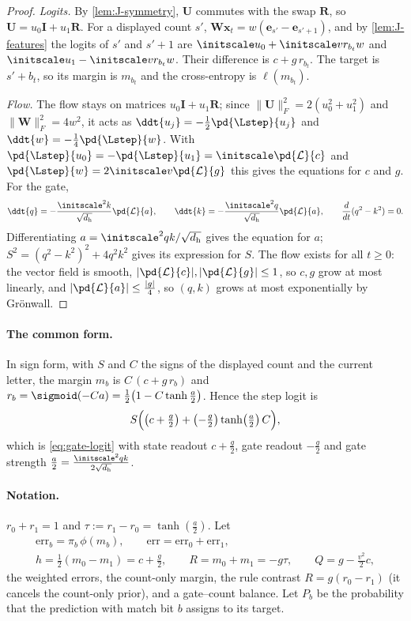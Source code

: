 \begin{proof}
\emph{Logits.} By \cref{lem:J-symmetry}, $\mathbf U$ commutes with the swap $\mathbf R$, so $\mathbf U=u_0\mathbf I+u_1\mathbf R$. For a displayed count $s'$,
$\mathbf W\bm x_t=w(\bm e_{s'}-\bm e_{s'+1})$, and by \cref{lem:J-features} the logits of $s'$ and $s'+1$ are $\initscale u_0+\initscale vr_{b_t}w$ and
$\initscale u_1-\initscale vr_{b_t}w$. Their difference is $c+g\,r_{b_t}$. The target is $s'+b_t$, so its margin is $m_{b_t}$ and the cross-entropy is $\ell(m_{b_t})$.

\emph{Flow.} The flow stays on matrices $u_0\mathbf I+u_1\mathbf R$; since $\|\mathbf U\|_F^2=2(u_0^2+u_1^2)$ and $\|\mathbf W\|_F^2=4w^2$, it acts as
$\ddt{u_j}=-\frac12\pd{\Lstep}{u_j}$ and $\ddt{w}=-\frac14\pd{\Lstep}{w}$. With $\pd{\Lstep}{u_0}=-\pd{\Lstep}{u_1}=\initscale\pd{\mathcal L}{c}$ and
$\pd{\Lstep}{w}=2\initscale v\pd{\mathcal L}{g}$ this gives the equations for $c$ and $g$. For the gate,
\[
 \ddt{q}=-\frac{\initscale^2k}{\sqrt{d_{\mathrm h}}}\pd{\mathcal L}{a},\qquad \ddt{k}=-\frac{\initscale^2q}{\sqrt{d_{\mathrm h}}}\pd{\mathcal L}{a},\qquad \frac{d}{dt}(q^2-k^2)=0.
\]
Differentiating $a=\initscale^2qk/\sqrt{d_{\mathrm h}}$ gives the equation for $a$; $S^2=(q^2-k^2)^2+4q^2k^2$ gives its expression for $S$. The flow exists for
all $t\ge0$: the vector field is smooth, $|\pd{\mathcal L}{c}|,|\pd{\mathcal L}{g}|\le1$, so $c,g$ grow at most linearly, and $|\pd{\mathcal L}{a}|\le\frac{|g|}{4}$,
so $(q,k)$ grows at most exponentially by Gr\"onwall.
\end{proof}

\paragraph{The common form.} In sign form, with $S$ and $C$ the signs of the displayed count and the current letter, the margin
$m_b$ is $C\,(c+g\,r_b)$ and $r_b=\sigmoid(-Ca)=\frac12\bigl(1-C\tanh\frac a2\bigr)$. Hence the step logit is
\[
 S\Bigl(\bigl(c+\tfrac g2\bigr)+\bigl(-\tfrac g2\bigr)\tanh\bigl(\tfrac a2\bigr)\,C\Bigr),
\]
which is \cref{eq:gate-logit} with state readout $c+\frac g2$, gate readout $-\frac g2$ and gate strength $\frac a2=\frac{\initscale^2qk}{2\sqrt{d_{\mathrm h}}}$.

\paragraph{Notation.} $r_0+r_1=1$ and $\tau:=r_1-r_0=\tanh(\frac{a}{2})$. Let
\begin{gather*}
 \mathrm{err}_b=\pi_b\,\phi(m_b),\qquad \mathrm{err}=\mathrm{err}_0+\mathrm{err}_1,\\
 h=\tfrac{1}{2}(m_0-m_1)=c+\tfrac{g}{2},\qquad R=m_0+m_1=-g\tau,\qquad Q=g-\tfrac{v^2}{2}c,
\end{gather*}
the weighted errors, the count-only margin, the rule contrast $R=g(r_0-r_1)$ (it cancels the count-only prior), and a gate--count balance. Let $P_b$ be the
probability that the prediction with match bit $b$ assigns to its target.

